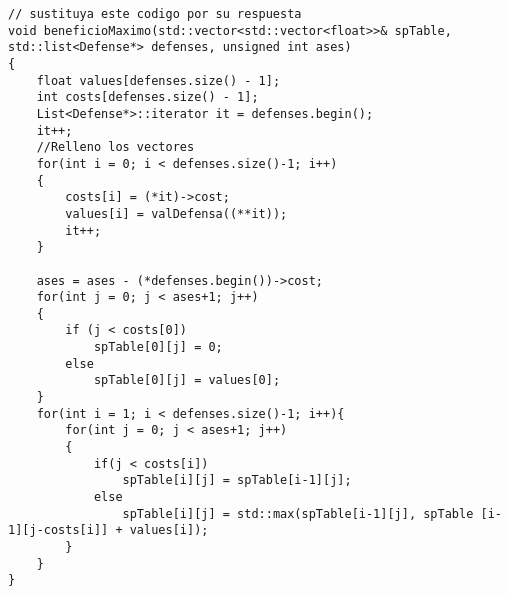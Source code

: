 \begin{lstlisting}
// sustituya este codigo por su respuesta
void beneficioMaximo(std::vector<std::vector<float>>& spTable, std::list<Defense*> defenses, unsigned int ases)
{
    float values[defenses.size() - 1];
    int costs[defenses.size() - 1];
    List<Defense*>::iterator it = defenses.begin();
    it++;
    //Relleno los vectores
    for(int i = 0; i < defenses.size()-1; i++)
    {
        costs[i] = (*it)->cost;
        values[i] = valDefensa((**it));
        it++;
    }

    ases = ases - (*defenses.begin())->cost;
    for(int j = 0; j < ases+1; j++)
    {
        if (j < costs[0])
            spTable[0][j] = 0;
        else
            spTable[0][j] = values[0];
    }
    for(int i = 1; i < defenses.size()-1; i++){
        for(int j = 0; j < ases+1; j++)
        {
            if(j < costs[i])
                spTable[i][j] = spTable[i-1][j];
            else
                spTable[i][j] = std::max(spTable[i-1][j], spTable [i-1][j-costs[i]] + values[i]);
        }
    }
}
\end{lstlisting}